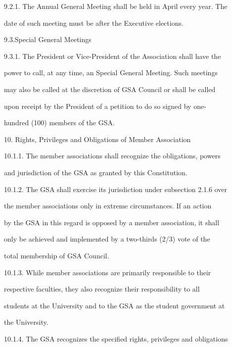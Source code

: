 \documentclass{article}
\begin{document}
9.2.1. The  Annual  General  Meeting  shall  be  held  in  April  every  year.  The  

date of such meeting must be after the Executive elections.  



9.3.Special General Meetings  



9.3.1. The  President  or  Vice-President  of  the  Association  shall  have  the  

power to call, at any time, an Special General Meeting. Such meetings  

may also be called at the discretion of  GSA  Council or shall be called  

upon  receipt  by  the  President  of  a  petition  to  do  so  signed  by  one- 

hundred (100) members of the GSA.  



  



10.  Rights, Privileges and Obligations of Member Association  



10.1.1.     The  member  associations  shall  recognize  the  obligations,  powers  

and jurisdiction of the GSA as granted by this Constitution.  



10.1.2.     The GSA shall exercise its jurisdiction under subsection 2.1.6 over  

the  member  associations  only  in  extreme  circumstances.  If  an  action  

by the GSA in this regard is opposed by a member association, it shall  

only  be  achieved  and  implemented  by  a  two-thirds  (2/3)  vote  of  the  

total membership of GSA  Council.  



10.1.3.     While   member   associations   are   primarily   responsible   to   their  

respective  faculties,  they  also  recognize  their  responsibility  to  all  

students at the University and to the GSA as the student government at  

the University.  



10.1.4.     The GSA recognizes the specified rights, privileges and obligations  
\end{document}
